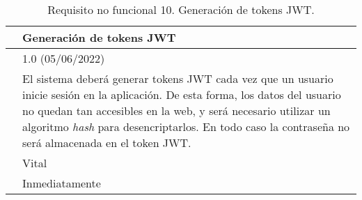 \begin{table}[H]
\begin{center}
\begin{tabular}{|p{3cm}|p{10cm}|} \hline
\centering {\bf NFR-10} & Generación de tokens JWT  \\ \hline\hline
\centering {\bf Versión} & 1.0 (05/06/2022) \\ \hline
\centering {\bf Descripción} & El sistema deberá generar tokens JWT cada vez que un usuario inicie sesión en la aplicación. De esta forma, los datos del usuario no quedan tan accesibles en la web, y será necesario utilizar un algoritmo  {\it hash} para desencriptarlos. En todo caso la contraseña no será almacenada en el token JWT. \\ \hline
\centering {\bf Importancia} & Vital \\ \hline
\centering {\bf Urgencia} & Inmediatamente \\ \hline
\end{tabular}
\caption{Requisito no funcional 10. Generación de tokens JWT.}
\label{enlaceNFR10}
\end{center}
\end{table}